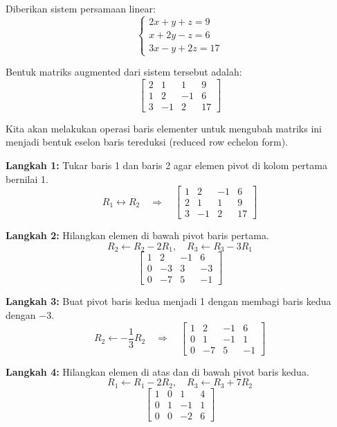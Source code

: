 \documentclass{article}
\author{}
\date{}
\begin{document}
Diberikan sistem persamaan linear:
\[
\begin{cases}
2x + y + z = 9 \\
x + 2y - z = 6 \\
3x - y + 2z = 17
\end{cases}
\]

Bentuk matriks augmented dari sistem tersebut adalah:
\[
\left[\begin{array}{ccc|c}
2 & 1 & 1 & 9 \\
1 & 2 & -1 & 6 \\
3 & -1 & 2 & 17
\end{array}\right]
\]

Kita akan melakukan operasi baris elementer untuk mengubah matriks ini menjadi bentuk eselon baris tereduksi (reduced row echelon form).

\textbf{Langkah 1:} Tukar baris 1 dan baris 2 agar elemen pivot di kolom pertama bernilai 1.
\[
R_1 \leftrightarrow R_2
\quad \Rightarrow \quad
\left[\begin{array}{ccc|c}
1 & 2 & -1 & 6 \\
2 & 1 & 1 & 9 \\
3 & -1 & 2 & 17
\end{array}\right]
\]

\textbf{Langkah 2:} Hilangkan elemen di bawah pivot baris pertama.
\[
R_2 \leftarrow R_2 - 2R_1, \quad R_3 \leftarrow R_3 - 3R_1
\]
\[
\left[\begin{array}{ccc|c}
1 & 2 & -1 & 6 \\
0 & -3 & 3 & -3 \\
0 & -7 & 5 & -1
\end{array}\right]
\]

\textbf{Langkah 3:} Buat pivot baris kedua menjadi 1 dengan membagi baris kedua dengan $-3$.
\[
R_2 \leftarrow -\frac{1}{3} R_2
\quad \Rightarrow \quad
\left[\begin{array}{ccc|c}
1 & 2 & -1 & 6 \\
0 & 1 & -1 & 1 \\
0 & -7 & 5 & -1
\end{array}\right]
\]

\textbf{Langkah 4:} Hilangkan elemen di atas dan di bawah pivot baris kedua.
\[
R_1 \leftarrow R_1 - 2R_2, \quad R_3 \leftarrow R_3 + 7R_2
\]
\[
\left[\begin{array}{ccc|c}
1 & 0 & 1 & 4 \\
0 & 1 & -1 & 1 \\
0 & 0 & -2 & 6
\end{array}\right]
\]
\end{document}
